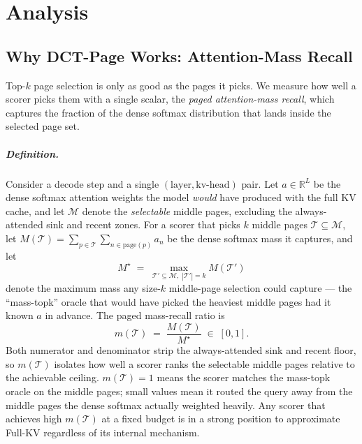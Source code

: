 \chapter{Analysis}\label{chap:analysis}


\section{Why DCT-Page Works: Attention-Mass Recall}\label{sec:mass-recall}

Top-$k$ page selection is only as good as the pages it picks.  We
measure how well a scorer picks them with a single scalar, the
\emph{paged attention-mass recall}, which captures the fraction of the
dense softmax distribution that lands inside the selected page set.

\paragraph{Definition.}
Consider a decode step and a single $(\text{layer}, \text{kv-head})$
pair.  Let $a \in \mathbb{R}^{L}$ be the dense softmax attention
weights the model \emph{would} have produced with the full KV cache,
and let $\mathcal{M}$ denote the \emph{selectable} middle pages,
excluding the always-attended sink and recent zones.  For a scorer
that picks $k$ middle pages
$\mathcal{T} \subseteq \mathcal{M}$, let
$M(\mathcal{T}) = \sum_{p \in \mathcal{T}} \sum_{n \in \text{page}(p)} a_n$
be the dense softmax mass it captures, and let
\[
  M^{\star}
  \;=\;
  \max_{\mathcal{T}' \subseteq \mathcal{M},\; |\mathcal{T}'| = k}
        M(\mathcal{T}')
\]
denote the maximum mass any size-$k$ middle-page selection could
capture --- the ``mass-topk'' oracle that would have picked the
heaviest middle pages had it known $a$ in advance.  The paged
mass-recall ratio is
\begin{equation}\label{eq:mass-recall}
  m(\mathcal{T})
  \;=\;
  \frac{M(\mathcal{T})}{M^{\star}}
  \;\in\; [0, 1].
\end{equation}
Both numerator and denominator strip the always-attended sink and
recent floor, so $m(\mathcal{T})$ isolates how well a scorer ranks
the selectable middle pages relative to the achievable ceiling.
$m(\mathcal{T}) = 1$ means the scorer matches the mass-topk oracle on
the middle pages; small values mean it routed the query away from the
middle pages the dense softmax actually weighted heavily.  Any scorer
that achieves high $m(\mathcal{T})$ at a fixed budget is in a strong
position to approximate Full-KV regardless of its internal mechanism.


